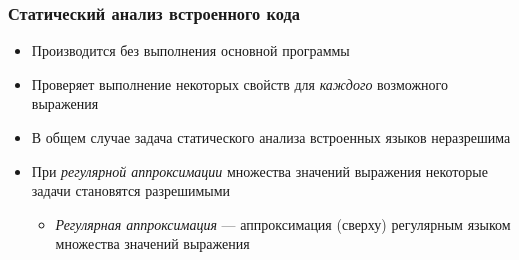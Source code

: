 \documentclass{beamer}
\begin{document}
\begin{frame}
  \transwipe[direction=90]
  \frametitle{Статический анализ встроенного кода}  
  \begin{itemize}
    \item Производится без выполнения основной программы
    \item Проверяет выполнение некоторых свойств для \emph{каждого} возможного выражения 
  \end{itemize}
  
  \begin{itemize}
    \item В общем случае задача статического анализа встроенных языков неразрешима 
    \item При \emph{регулярной аппроксимации} множества значений выражения некоторые задачи становятся разрешимыми
    \begin{itemize}
      \item \emph{Регулярная аппроксимация} --- аппроксимация (сверху) регулярным языком множества значений выражения 
    \end{itemize}
  \end{itemize}
\end{frame}
\end{document}
